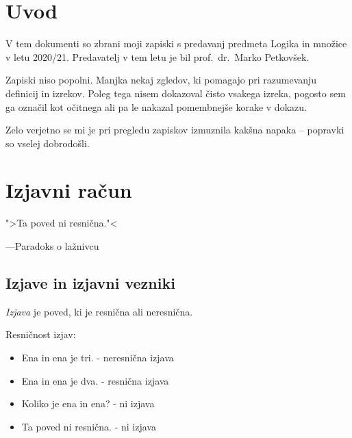 \documentclass[12pt, a4paper]{article}
\begin{document}
\renewcommand{\headheight}{20pt}

\maketitle
\newpage
\tableofcontents

\newpage

\section*{Uvod}

V tem dokumenti so zbrani moji zapiski s predavanj predmeta Logika in množice v letu 2020/21. Predavatelj v tem letu je bil prof.~dr.~Marko Petkovšek.

Zapiski niso popolni. Manjka nekaj zgledov, ki pomagajo pri razumevanju definicij in izrekov. Poleg tega nisem dokazoval čisto vsakega izreka, pogosto sem ga označil kot očitnega ali pa le nakazal pomembnejše korake v dokazu.

Zelo verjetno se mi je pri pregledu zapiskov izmuznila kakšna napaka -- popravki so vselej dobrodošli.

\newpage

\section{Izjavni račun}

\epigraph{">Ta poved ni resnična."<}{---Paradoks o lažnivcu}

\subsection{Izjave in izjavni vezniki}

\begin{okvir}
\begin{definicija}
\emph{Izjava} je poved, ki je resnična ali neresnična.
\end{definicija}
\end{okvir}

\begin{zgled}
Resničnost izjav:

\begin{itemize}
\item Ena in ena je tri. - neresnična izjava
\item Ena in ena je dva. - resnična izjava
\item Koliko je ena in ena? - ni izjava
\item Ta poved ni resnična. - ni izjava
\end{itemize}
\end{zgled}
\end{document}

